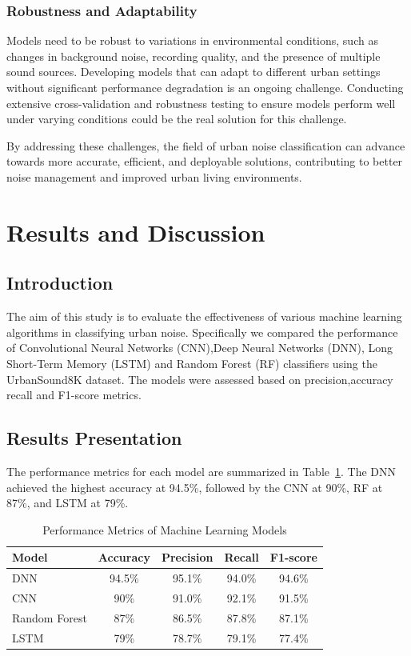 \documentclass[conference]{IEEEtran}
\begin{document}
\subsubsection{Robustness and Adaptability}
Models need to be robust to variations in environmental conditions, such as changes in background noise, recording quality, and the presence of multiple sound sources. Developing models that can adapt to different urban settings without significant performance degradation is an ongoing challenge. Conducting extensive cross-validation and robustness testing to ensure models perform well under varying conditions could be the real solution for this challenge.


By addressing these challenges, the field of urban noise classification can advance towards more accurate, efficient, and deployable solutions, contributing to better noise management and improved urban living environments.


\section{Results and Discussion}

\subsection{Introduction}

The aim of this study is to evaluate the effectiveness of various machine learning algorithms in classifying urban noise. Specifically we compared the performance of Convolutional Neural Networks (CNN),Deep Neural Networks (DNN), Long Short-Term Memory (LSTM) and Random Forest (RF) classifiers using the UrbanSound8K dataset. The models were assessed based on precision,accuracy recall and F1-score metrics.

\subsection{Results Presentation}

The performance metrics for each model are summarized in Table~\ref{tab:performance_metrics}. The DNN achieved the highest accuracy at 94.5\%, followed by the CNN at 90\%, RF at 87\%, and LSTM at 79\%.

\begin{table}[h]
\centering
\caption{Performance Metrics of Machine Learning Models}
\label{tab:performance_metrics}
\begin{tabular}{|l|c|c|c|c|}
\hline
\textbf{Model} & \textbf{Accuracy} & \textbf{Precision} & \textbf{Recall} & \textbf{F1-score} \\ \hline
DNN           & 94.5\%    & 95.1\%     & 94.0\%  & 94.6\%    \\ \hline
CNN           & 90\%      & 91.0\%     & 92.1\%  & 91.5\%    \\ \hline
Random Forest & 87\%      & 86.5\%     & 87.8\%  & 87.1\%    \\ \hline
LSTM          & 79\%      & 78.7\%     & 79.1\%  & 77.4\%    \\ \hline
\end{tabular}
\end{table}
\end{document}
